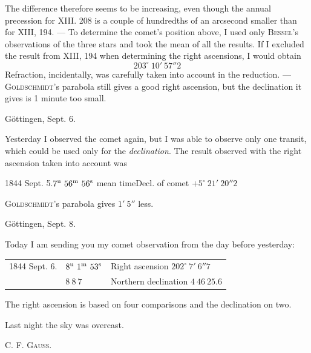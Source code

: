 The difference therefore seems to be increasing, even though the annual precession for XIII. 208 is a couple of hundredths of an arcsecond smaller than for XIII, 194. --- To determine the comet’s position above, I used only \textsc{Bessel}’s observations of the three stars and took the mean of all the results. If I excluded the result from XIII, 194 when determining the right ascensions, I would obtain
\[
203^\circ\ 10'\ 57''2
\]
\noindent Refraction, incidentally, was carefully taken into account in the reduction. --- \textsc{Goldschmidt}’s parabola still gives a good right ascension, but the declination it gives is 1 minute too small.

\begin{flushright}Göttingen, Sept. 6.\end{flushright}

Yesterday I observed the comet again, but I was able to observe only one transit, which could be used only for the \emph{declination}. The result observed with the right ascension taken into account was

\begin{center}
1844 Sept. 5.\quad $7^{\rm u}\ 56^{\rm m}\ 56^{\rm s}$ mean time\quad Decl. of comet $+5^\circ\ 21'\ 20''2$
\end{center}

\textsc{Goldschmidt}’s parabola gives $1'\ 5''$ less.

\begin{flushright}Göttingen, Sept. 8.\end{flushright}

Today I am sending you my comet observation from the day before yesterday:

\begin{center}
\setlength{\tabcolsep}{3pt}
\begin{tabular}{lll}
1844 Sept. 6. & $8^{\rm u}\ 1^{\rm m}\ 53^{\rm s}$ & Right ascension $202^\circ\ 7'\ 6''7$ \\
 & $8\ 8\ 7$ & Northern declination $4\ 46\ 25.6$ \\
\end{tabular}
\end{center}

The right ascension is based on four comparisons and the declination on two.

Last night the sky was overcast.
\begin{flushright}C. F. \textsc{Gauss}.\end{flushright}
